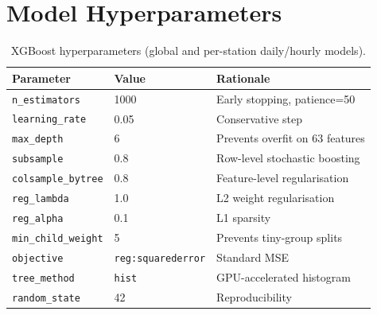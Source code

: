 \documentclass[11pt,a4paper]{article}
\begin{document}
\appendix
\section{Model Hyperparameters}

\begin{table}[H]
    \centering
    \caption{XGBoost hyperparameters (global and per-station daily/hourly models).}
    \begin{tabular}{lll}
        \toprule
        \textbf{Parameter} & \textbf{Value} & \textbf{Rationale} \\
        \midrule
        \texttt{n\_estimators}     & 1000 & Early stopping, patience=50 \\
        \texttt{learning\_rate}    & 0.05 & Conservative step \\
        \texttt{max\_depth}        & 6    & Prevents overfit on 63 features \\
        \texttt{subsample}         & 0.8  & Row-level stochastic boosting \\
        \texttt{colsample\_bytree} & 0.8  & Feature-level regularisation \\
        \texttt{reg\_lambda}       & 1.0  & L2 weight regularisation \\
        \texttt{reg\_alpha}        & 0.1  & L1 sparsity \\
        \texttt{min\_child\_weight}& 5    & Prevents tiny-group splits \\
        \texttt{objective}         & \texttt{reg:squarederror} & Standard MSE \\
        \texttt{tree\_method}      & \texttt{hist} & GPU-accelerated histogram \\
        \texttt{random\_state}     & 42   & Reproducibility \\
        \bottomrule
    \end{tabular}
\end{table}
\end{document}
